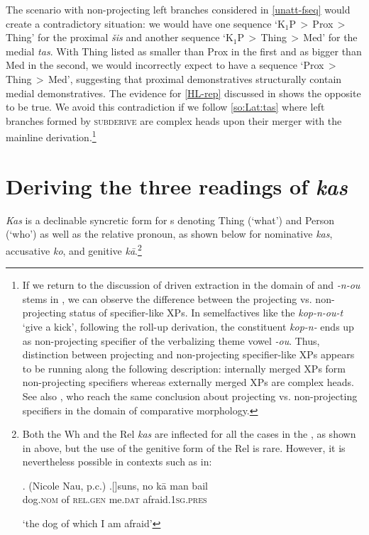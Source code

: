 \noindent The scenario with non-projecting left branches considered in \ref{unatt-fseq} would create a contradictory situation: we would have one sequence `K$_{1}$P\,$>$\,Prox\,$>$\,Thing' for the proximal \textit{\v{s}is} and another sequence `K$_{1}$P\,$>$\,Thing\,$>$\,Med' for the medial \textit{tas}. With Thing listed as smaller than Prox in the first and as bigger than Med in the second, we would incorrectly expect to have a sequence `Prox\,$>$\,Thing\,$>$\,Med', suggesting that proximal demonstratives structurally contain medial demonstratives. The evidence for \ref{HL-rep} discussed in \cite{Lander-Haegeman2016} shows the opposite to be true.
We avoid this contradiction if we follow \ref{so:Lat:tas} where left branches formed by \textsc{subderive} are complex heads upon their merger with the mainline derivation.\footnote{If we return to the discussion of  driven extraction in the domain of  and   \textit{-n-ou} stems in  , we can observe the difference between the projecting vs. non-projecting status of specifier-like XPs. In semelfactives like the  \textit{kop-n-ou-t} `give a kick', following the roll-up derivation, the constituent \textit{kop-n-} ends up as non-projecting specifier of the verbalizing theme  vowel \textit{-ou}. Thus, distinction between projecting and non-projecting  specifier-like XPs appears to be running along the following description: internally merged XPs form non-projecting specifiers whereas externally merged XPs are complex heads. See also \cite{CCW2017}, who reach the same conclusion about projecting vs. non-projecting specifiers in the domain of  comparative morphology.
} %



\section{Deriving the three readings of \textit{kas}}\label{section:kas}

\textit{Kas} is a declinable syncretic form for s denoting Thing (`what') and Person (`who') as well as the relative pronoun,  as shown below for nominative \textit{kas}, accusative \textit{ko}, and genitive 
\textit{k\={a}}.\footnote{Both the Wh and the Rel \textit{kas} are inflected for all the cases in the  , as shown in  above, but the use of the genitive form of the Rel is rare. However, it is nevertheless possible in contexts such as in:

\ex.  (Nicole Nau, p.c.)
\ag.[]\hspace{-22pt}suns, no k\={a} man bail\\
\hspace{-22pt}dog.\textsc{nom} of \textsc{rel.gen} me.\textsc{dat} afraid.\textsc{1sg.pres}\\
\hspace{-22pt}\strut `the dog of which I am afraid'

}%

